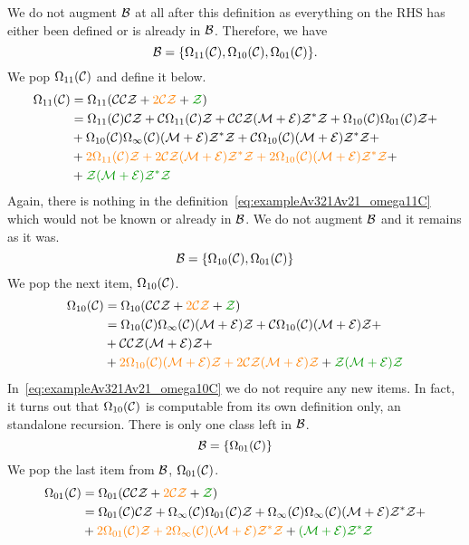 \documentclass[12pt, a4paper, twoside]{report}
\begin{document}
We do not augment $\mathcal{B}$ at all after this definition as everything on the RHS has either been defined or is already in $\mathcal{B}$. Therefore, we have
$$\mathcal{B} = \{\Omega_{11}(\mathcal{C}),\Omega_{10}(\mathcal{C}), \Omega_{01}(\mathcal{C})\}.$$
We pop $\Omega_{11}(\mathcal{C})$ and define it below.
\begin{align}
  \begin{aligned}
    \Omega_{11}(\C) &= \Omega_{11}(\C\C\Z + \textcolor{orange}{2\C\Z} + \textcolor{green}{\Z})\\
    &= \Omega_{11}(\C)\C\Z + \C\Omega_{11}(\C)\Z + \C\C\Z(\M+\EE)\Z^*\Z + \Omega_{10}(\C)\Omega_{01}(\C)\Z +\\
    &+ \Omega_{10}(\C)\Omega_\infty(\C)(\M+\EE)\Z^*\Z + \C\Omega_{10}(\C)(\M+\EE)\Z^*\Z +\\
    &+ \textcolor{orange}{2\Omega_{11}(\C)\Z + 2\C\Z(\M+\EE)\Z^*\Z + 2\Omega_{10}(\C)(\M+\EE)\Z^*\Z} +\\
    &+\textcolor{green}{\Z(\M+\EE)\Z^*\Z}\\
  \end{aligned}
  \label{eq:exampleAv321Av21_omega11C}
\end{align}
Again, there is nothing in the definition~\eqref{eq:exampleAv321Av21_omega11C} which would not be known or already in $\mathcal{B}$. We do not augment $\mathcal{B}$ and it remains as it was.
$$\mathcal{B} = \{\Omega_{10}(\mathcal{C}), \Omega_{01}(\mathcal{C})\}$$
We pop the next item, $\Omega_{10}(\mathcal{C})$.
\begin{align}
  \begin{aligned}
    \Omega_{10}(\C) &= \Omega_{10}(\C\C\Z + \textcolor{orange}{2\C\Z} + \textcolor{green}{\Z})\\
    &= \Omega_{10}(\C)\Omega_\infty(\C)(\M+\EE)\Z + \C\Omega_{10}(\C)(\M+\EE)\Z +\\
    &+ \C\C\Z(\M+\EE)\Z +\\
    &+ \textcolor{orange}{2\Omega_{10}(\C)(\M+\EE)\Z + 2\C\Z(\M+\EE)\Z} + \textcolor{green}{\Z(\M+\EE)\Z}
  \end{aligned}
  \label{eq:exampleAv321Av21_omega10C}
\end{align}
In~\eqref{eq:exampleAv321Av21_omega10C} we do not require any new items. In fact, it turns out that $\Omega_{10}(\mathcal{C})$ is computable from its own definition only, an standalone recursion. There is only one class left in $\mathcal{B}$.
$$\mathcal{B} = \{\Omega_{01}(\mathcal{C})\}$$
We pop the last item from $\mathcal{B}$, $\Omega_{01}(\mathcal{C})$.
\begin{align}
  \begin{aligned}
    \Omega_{01}(\C) &= \Omega_{01}(\C\C\Z + \textcolor{orange}{2\C\Z} + \textcolor{green}{\Z})\\
    &= \Omega_{01}(\C)\C\Z + \Omega_\infty(\C)\Omega_{01}(\C)\Z + \Omega_\infty(\C)\Omega_\infty(\C)(\M+\EE)\Z^*\Z +\\
    &+ \textcolor{orange}{2\Omega_{01}(\C)\Z + 2\Omega_\infty(\C)(\M+\EE)\Z^*\Z} + \textcolor{green}{(\M+\EE)\Z^*\Z}
  \end{aligned}
  \label{eq:exampleAv321Av21_omega01C}
\end{align}
\end{document}
